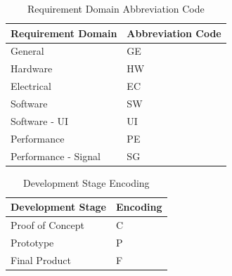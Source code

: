 \bgroup
\def\arraystretch{1.5}
\begin{table}[H]
\centering
\begin{tabular}{ | m{7cm} | m{7cm}| } 
\hline
\rowcolor{lightgray} \textbf{Requirement Domain} & \textbf{Abbreviation Code} \\ 
\hline
General & GE\\ 
\hline
Hardware & HW\\ 
\hline
 Electrical & EC\\  
\hline
 Software & SW\\ 
\hline
 Software - UI & UI\\ 
\hline
 Performance & PE\\ 
\hline
Performance - Signal & SG\\ 
\hline
\end{tabular}
\caption{Requirement Domain Abbreviation Code}
\end{table}

\bgroup
\def\arraystretch{1.5}
\begin{table}[H]
\centering
\begin{tabular}{ | m{7cm} | m{7cm}| } 
\hline
\rowcolor{lightgray} \textbf{Development Stage} & \textbf{Encoding} \\ 
\hline
Proof of Concept & C\\ 
\hline
Prototype & P\\ 
\hline
Final Product & F\\  
\hline
\end{tabular}
\caption{Development Stage Encoding}
\end{table}	
	
	
%



















